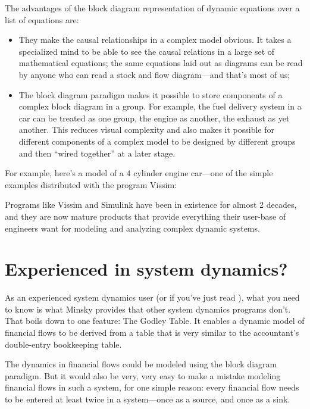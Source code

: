 The advantages of the block diagram representation of dynamic equations
over a list of equations are:
\begin{itemize}
\item    They make the causal relationships in a complex model
  obvious. It takes a specialized mind to be able to see the causal
  relations in a large set of mathematical equations; the same
  equations laid out as diagrams can be read by anyone who can read
  a stock and flow diagram---and that's most of us;
\item The block diagram paradigm makes it possible to store components of
  a complex block diagram in a group. For example, the fuel delivery
  system in a car can be treated as one group, the engine as another,
  the exhaust as yet another. This reduces visual complexity and also
  makes it possible for different components of a complex model to be
  designed by different groups and then ``wired together'' at a later
  stage.
\end{itemize}

For example, here's a model of a 4 cylinder engine car---one of the
simple examples distributed with the program Vissim:

\begin{center}
\end{center}

Programs like Vissim and Simulink have been in existence for almost 2
decades, and they are now mature products that provide everything
their user-base of engineers want for modeling and analyzing complex
dynamic systems. 

\section{Experienced in system dynamics?}
\label{intro:experienced}

As an experienced system dynamics user (or if you've just read  ), what you need to know is what Minsky
provides that other system dynamics programs don't. That boils down to
one feature: The Godley Table. It enables a dynamic model of
financial flows to be derived from a table that is very similar to the
accountant's double-entry bookkeeping table.


The dynamics in financial flows could be modeled using the block diagram
paradigm. But it would also be very, very easy to make a mistake
modeling financial flows in such a system, for one simple reason:
every financial flow needs to be entered at least twice in a
system---once as a source, and once as a sink.


